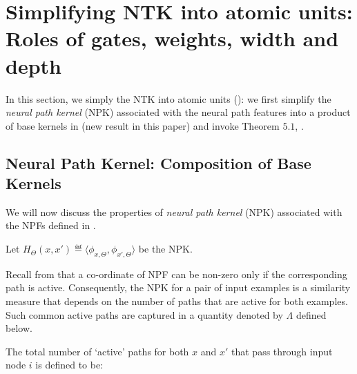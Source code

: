 \section{Simplifying NTK into atomic units: Roles of gates, weights, width and depth}\label{sec:fc}
In this section, we simply the NTK into atomic units (): we first simplify the \emph{neural path kernel} (NPK) associated with the neural path features into a product of base kernels in  (new result in this paper) and invoke {Theorem $5.1$}, \cite{npk}. 
\subsection{Neural Path Kernel: Composition of Base Kernels}
We will now discuss the properties of \emph{neural path kernel} (NPK) associated with the NPFs defined in .  
\begin{definition}
Let $H_{\Theta}(x,x')\eqdef\langle\phi_{x,\Theta},\phi_{x',\Theta} \rangle$ be the NPK.
\end{definition}

Recall from  that a co-ordinate of NPF can be non-zero only if the corresponding path is active. Consequently, the NPK for a pair of input examples is a similarity measure that depends on the number of paths that are active for both examples. Such common active paths are captured in a quantity denoted by $\Lambda$ defined below.
\begin{definition}\label{def:cnnlambda}
The total number of `active' paths for both $x$ and $x'$ that pass through input node $i$ is defined to be:
\end{definition}
